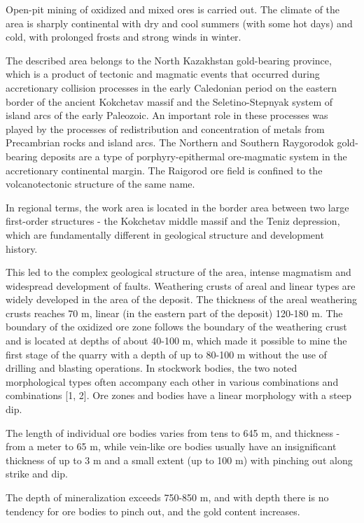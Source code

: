 Open-pit mining of oxidized and mixed ores is carried out. The climate
of the area is sharply continental with dry and cool summers (with some
hot days) and cold, with prolonged frosts and strong winds in winter.

The described area belongs to the North Kazakhstan gold-bearing
province, which is a product of tectonic and magmatic events that
occurred during accretionary collision processes in the early Caledonian
period on the eastern border of the ancient Kokchetav massif and the
Seletino-Stepnyak system of island arcs of the early Paleozoic. An
important role in these processes was played by the processes of
redistribution and concentration of metals from Precambrian rocks and
island arcs. The Northern and Southern Raygorodok gold-bearing deposits
are a type of porphyry-epithermal ore-magmatic system in the
accretionary continental margin. The Raigorod ore field is confined to
the volcanotectonic structure of the same name.

In regional terms, the work area is located in the border area between
two large first-order structures - the Kokchetav middle massif and the
Teniz depression, which are fundamentally different in geological
structure and development history.

This led to the complex geological structure of the area, intense
magmatism and widespread development of faults. Weathering crusts of
areal and linear types are widely developed in the area of the deposit.
The thickness of the areal weathering crusts reaches 70 m, linear (in
the eastern part of the deposit) 120-180 m. The boundary of the oxidized
ore zone follows the boundary of the weathering crust and is located at
depths of about 40-100 m, which made it possible to mine the first stage
of the quarry with a depth of up to 80-100 m without the use of drilling
and blasting operations. In stockwork bodies, the two noted
morphological types often accompany each other in various combinations
and combinations {[}1, 2{]}. Ore zones and bodies have a linear
morphology with a steep dip.

The length of individual ore bodies varies from tens to 645 m, and
thickness - from a meter to 65 m, while vein-like ore bodies usually
have an insignificant thickness of up to 3 m and a small extent (up to
100 m) with pinching out along strike and dip.

The depth of mineralization exceeds 750-850 m, and with depth there is
no tendency for ore bodies to pinch out, and the gold content increases.

